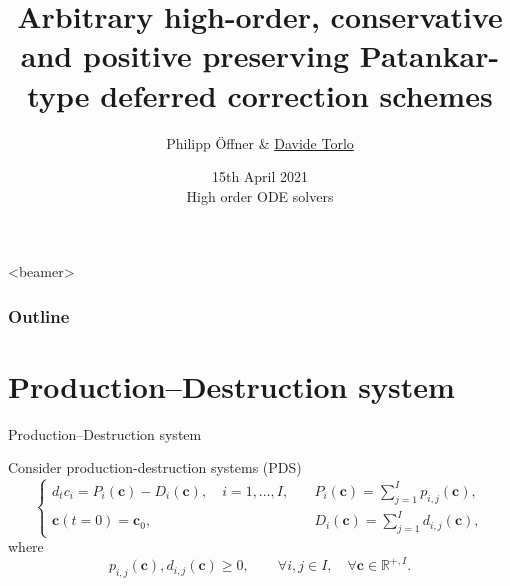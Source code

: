 \documentclass[aspectratio=169]{beamer}
\title[mPDeC modified Patankar Deferred Correction]{Arbitrary high-order, conservative and positive preserving Patankar-type deferred correction schemes}
\author[P. \"Offner \& D. Torlo]{Philipp \"Offner \& \underline{Davide Torlo}}
\institute[Inria]
{Inria Bordeaux}
\date[]
{15th April 2021\\ \vspace{5mm}
High order ODE solvers\\ \vspace{8mm}
}
\newcommand{\R}{\mathbb R}
\newcommand{\1}{\begin{pmatrix}
                 1\\
                 1
                \end{pmatrix}}
\def\R{\mathbb{R}}
\def\bc{\mathbf{c}}
\begin{document}
\begin{frame}

\titlepage



\end{frame}

\begin{frame}<beamer>
	\frametitle{Outline}
	  \tableofcontents
\end{frame}

\section{Production--Destruction system}
\begin{frame}{Production--Destruction system}

Consider {\color{lightgreen}production-destruction} systems (PDS) 
\begin{equation}\label{eq:original_model}
\begin{cases}
d_t c_i = P_i(\bc ) - D_i(\bc ) , \quad  i=1,\dots,I,\quad & P_i(\bc) = \sum_{j=1}^I p_{i,j}(\bc),\\
\bc(t=0)=\bc_0,& D_i(\bc) = \sum_{j=1}^I d_{i,j}(\bc),
\end{cases}
\end{equation}
where
$$p_{i,j}(\bc) , d_{i,j} (\bc) \geq 0, \qquad \forall i,j \in I, \quad \forall \bc \in \R^{+,I}.$$


\end{frame}
\end{document}
